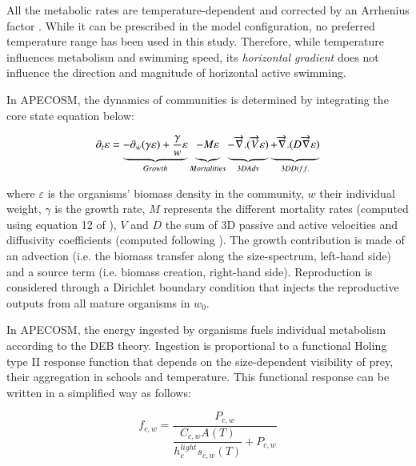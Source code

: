 All the metabolic rates are temperature-dependent and corrected by an Arrhenius factor \citep{mauryModelingEnvironmentalEffects2007, mauryIndividualsPopulationsCommunities2013}. While it can be prescribed in the model configuration, no preferred temperature range has been used in this study. Therefore, while temperature influences metabolism and swimming speed, its \emph{horizontal gradient} does not influence the direction and magnitude of horizontal active swimming.

In APECOSM, the dynamics of communities is determined by integrating the core state equation below:

\begin{equation}
\partial_t \varepsilon = \underbrace{- \partial_w(\gamma \varepsilon) + \frac{\gamma}{w}\varepsilon}_{Growth} 
\underbrace{- M \varepsilon \vphantom{\frac{\gamma}{w}\varepsilon}}_{Mortalities}
\underbrace{-\overrightarrow{\nabla}.(\overrightarrow{V} \varepsilon) \vphantom{\frac{\gamma}{w}\varepsilon}}_{3D Adv} 
\underbrace{+ \overrightarrow{\nabla} . (D \overrightarrow{\nabla} \varepsilon) \vphantom{\frac{\gamma}{w}\varepsilon}}_{3D Diff.}
\label{eq:apecosm_trend}
\end{equation}

where $\varepsilon$  is the organisms' biomass density in the community, $w$ their individual weight, $\gamma$ is the growth rate, $M$ represents the different mortality rates (computed using equation 12 of \citealt{mauryIndividualsPopulationsCommunities2013}), $V$ and $D$ the sum of 3D passive and active velocities and diffusivity coefficients (computed following \citealt{faugerasAdvectiondiffusionreactionSizestructuredFish2005}). The growth contribution is made of an advection (i.e. the biomass transfer along the size-spectrum, left-hand side) and a source term (i.e. biomass creation, right-hand side). Reproduction is considered through a Dirichlet boundary condition that injects the reproductive outputs from all mature organisms in $w_0$.

In APECOSM, the energy ingested by organisms fuels individual metabolism according to the DEB theory. Ingestion is proportional to a functional Holing type II response function that depends on the size-dependent visibility of prey, their aggregation in schools and temperature. This functional response can be written in a simplified way as follows:

\begin{equation}
f_{c, w} = \dfrac
{P_{c, w}}
{
\dfrac
{C_{c, w} A(T)}
{h_c^{light} s_{c, w}(T)} + P_{c, w}
}
\label{eq:repfonct}
\end{equation}


